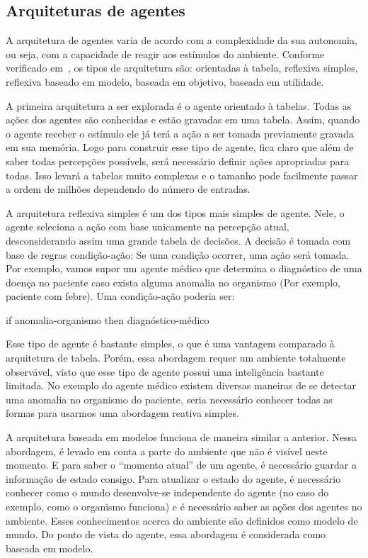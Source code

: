\subsection{Arquiteturas de agentes}

A arquitetura de agentes varia de acordo com a complexidade da sua autonomia, ou seja, com a capacidade de reagir aos estímulos do ambiente. Conforme verificado em~\cite{novig95}, os tipos de arquitetura são: orientadas à tabela, reflexiva simples, reflexiva baseado em modelo, baseada em objetivo, baseada em utilidade.

A primeira arquitetura a ser explorada é o agente orientado à tabelas. Todas as ações dos agentes são conhecidas e estão gravadas em uma tabela. Assim, quando o agente receber o estímulo ele já terá a ação a ser tomada previamente gravada em sua memória. Logo para construir esse tipo de agente, fica claro que além de saber todas percepções possívels, será necessário definir ações apropriadas para todas. Isso levará a tabelas muito complexas e o tamanho pode facilmente passar a ordem de milhões dependendo do número de entradas.

A arquitetura reflexiva simples é um dos tipos mais simples de agente. Nele, o agente seleciona a ação com base unicamente na percepção atual, desconsiderando assim uma grande tabela de decisões. A decisão é tomada com base de regras condição-ação: Se uma condição ocorrer, uma ação será tomada. Por exemplo, vamos supor um agente médico que determina o diagnóstico de uma doença no paciente caso exista alguma anomalia no organismo (Por exemplo, paciente com febre). Uma condição-ação poderia ser:

if anomalia-organismo then diagnóstico-médico

Esse tipo de agente é bastante simples, o que é uma vantagem comparado à arquitetura de tabela. Porém, essa abordagem requer um ambiente totalmente observável, visto que esse tipo de agente possui uma inteligência bastante limitada. No exemplo do agente médico existem diversas maneiras de se detectar uma anomalia no organismo do paciente, seria necessário conhecer todas as formas para usarmos uma abordagem reativa simples.

A arquitetura baseada em modelos funciona de maneira similar a anterior. Nessa abordagem, é levado em conta a parte do ambiente que não é visível neste momento. E para saber o ``momento atual'' de um agente, é necessário guardar a informação de estado consigo. Para atualizar o estado do agente, é necessário conhecer como o mundo desenvolve-se independente do agente (no caso do exemplo, como o organismo funciona) e é necessário saber as ações dos agentes no ambiente. Esses conhecimentos acerca do ambiente são definidos como modelo de mundo. Do ponto de vista do agente, essa abordagem é considerada como baseada em modelo.

